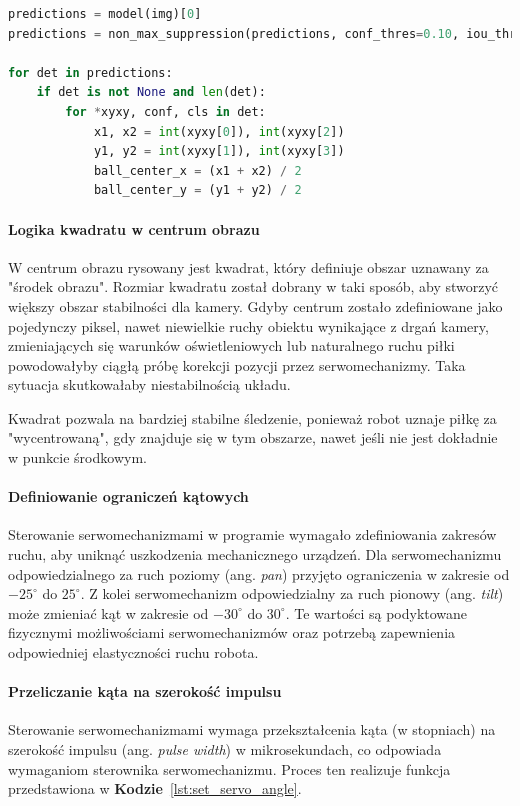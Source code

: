 \documentclass[a4paper,twoside,12pt]{book}
\begin{document}
\begin{lstlisting}[language=Python, caption={Logika detekcji piłki przy użyciu modelu YOLO.}, label={lst:ball_detection}, captionpos=b]
predictions = model(img)[0]
predictions = non_max_suppression(predictions, conf_thres=0.10, iou_thres=0.45)

for det in predictions:
    if det is not None and len(det):
        for *xyxy, conf, cls in det:
            x1, x2 = int(xyxy[0]), int(xyxy[2])
            y1, y2 = int(xyxy[1]), int(xyxy[3])
            ball_center_x = (x1 + x2) / 2
            ball_center_y = (y1 + y2) / 2
\end{lstlisting}

\newpage
\paragraph{Logika kwadratu w centrum obrazu}
W centrum obrazu rysowany jest kwadrat, który definiuje obszar uznawany za "środek obrazu". Rozmiar kwadratu został dobrany w taki sposób, aby stworzyć większy obszar stabilności dla kamery. Gdyby centrum zostało zdefiniowane jako pojedynczy piksel, nawet niewielkie ruchy obiektu wynikające z drgań kamery, zmieniających się warunków oświetleniowych lub naturalnego ruchu piłki powodowałyby ciągłą próbę korekcji pozycji przez serwomechanizmy. Taka sytuacja skutkowałaby niestabilnością układu.

Kwadrat pozwala na bardziej stabilne śledzenie, ponieważ robot uznaje piłkę za "wycentrowaną", gdy znajduje się w tym obszarze, nawet jeśli nie jest dokładnie w punkcie środkowym.

\paragraph{Definiowanie ograniczeń kątowych}
Sterowanie serwomechanizmami w programie wymagało zdefiniowania zakresów ruchu, aby uniknąć uszkodzenia mechanicznego urządzeń. Dla serwomechanizmu odpowiedzialnego za ruch poziomy (ang. \textit{pan}) przyjęto ograniczenia w zakresie od $-25^{\circ}$ do $25^{\circ}$. Z kolei serwomechanizm odpowiedzialny za ruch pionowy (ang. \textit{tilt}) może zmieniać kąt w zakresie od $-30^{\circ}$ do $30^{\circ}$. Te wartości są podyktowane fizycznymi możliwościami serwomechanizmów oraz potrzebą zapewnienia odpowiedniej elastyczności ruchu robota.

\paragraph{Przeliczanie kąta na szerokość impulsu}
Sterowanie serwomechanizmami wymaga przekształcenia kąta (w stopniach) na szerokość impulsu (ang. \textit{pulse width}) w mikrosekundach, co odpowiada wymaganiom sterownika serwomechanizmu. Proces ten realizuje funkcja przedstawiona w \textbf{Kodzie}~\ref{lst:set_servo_angle}.
\end{document}
